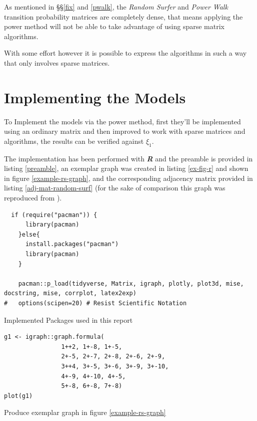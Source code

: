 \documentclass[11pt]{report}
\begin{document}
As mentioned in \S\S \ref{fix} and \ref{pwalk}, the \emph{Random Surfer} and \emph{Power Walk}
transition probability matrices are completely dense, that means applying the
power method will not be able to take advantage of using sparse matrix
algorithms.

With some effort however it is possible to express the algorithms in such a way that only involves sparse matrices.

\section{Implementing the Models}
\label{implement_models}
To Implement the models via the power method, first they'll be implemented using
an ordinary matrix and then improved to work with sparse matrices and
algorithms, the results can be verified against \(\xi_{1}\).

The implementation has been performed with \emph{\textbf{R}} and the preamble is
provided in listing \ref{preamble}, an exemplar graph was created in listing \ref{ex-fig-r} and shown in figure \ref{example-rs-graph}, and the corresponding adjacency matrix provided in listing \ref{adj-mat-random-surf} (for the sake of comparison this graph was reproduced from \cite{parkPowerWalkRevisiting2013}).




\begin{listing}[htbp]
\begin{tcolorbox}
\begin{verbatim}
  if (require("pacman")) {
      library(pacman)
    }else{
      install.packages("pacman")
      library(pacman)
    }

    pacman::p_load(tidyverse, Matrix, igraph, plotly, plot3d, mise, docstring, mise, corrplot, latex2exp)
#   options(scipen=20) # Resist Scientific Notation
\end{verbatim}
\caption{\label{preamble}Implemented Packages used in this report}
\end{tcolorbox}
\end{listing}


\begin{listing}[htbp]
\begin{tcolorbox}
\begin{verbatim}
g1 <- igraph::graph.formula(
                1++2, 1+-8, 1+-5,
                2+-5, 2+-7, 2+-8, 2+-6, 2+-9,
                3++4, 3+-5, 3+-6, 3+-9, 3+-10,
                4+-9, 4+-10, 4+-5,
                5+-8, 6+-8, 7+-8)
plot(g1)
\end{verbatim}
\caption{\label{ex-fig-r}Produce exemplar graph in figure \ref{example-rs-graph}}
\end{tcolorbox}
\end{listing}
\end{document}
